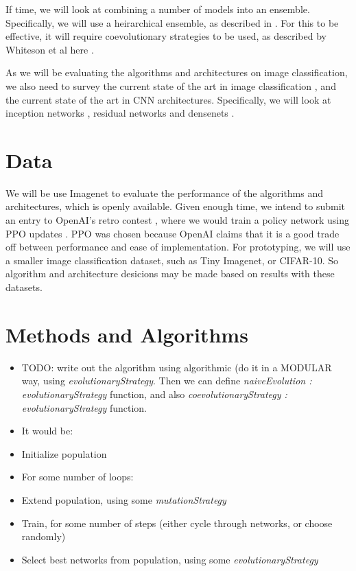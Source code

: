 \documentclass[10pt,twocolumn,letterpaper]{article}
\begin{document}
If time, we will look at combining a number of models into an ensemble. Specifically, we will use a heirarchical ensemble, as described in \cite{heirarchicalensemble}. For this to be effective, it will require coevolutionary strategies to be used, as described by Whiteson et al here \cite{shimonsarl}.

As we will be evaluating the algorithms and architectures on image classification, we also need to survey the current state of the art in image classification \cite{classify4, classify2, classify3, classify6, resnet3, as1}, and the current state of the art in CNN architectures. Specifically, we will look at inception networks \cite{inception1, inception2, inception3}, residual networks \cite{resnet1, resnet2, resnet3} and densenets \cite{densenet}.




\section{Data}
We will be use Imagenet \cite{imagenet} to evaluate the performance of the algorithms and architectures, which is openly available. Given enough time, we intend to submit an entry to OpenAI's retro contest \cite{retrocontest}, where we would train a policy network using PPO updates \cite{PPO}. PPO was chosen because OpenAI claims that it is a good trade off between performance and ease of implementation. For prototyping, we will use a smaller image classification dataset, such as Tiny Imagenet, or CIFAR-10. So algorithm and architecture desicions may be made based on results with these datasets. 


\section{Methods and Algorithms}
\begin{itemize}
	\item TODO: write out the algorithm using algorithmic (do it in a MODULAR way, using \textit{evolutionaryStrategy}. Then we can define \textit{naiveEvolution : evolutionaryStrategy} function, and also \textit{coevolutionaryStrategy : evolutionaryStrategy} function.
    \item It would be:
    \item Initialize population
    \item For some number of loops:
    \item Extend population, using some \textit{mutationStrategy}
    \item Train, for some number of steps (either cycle through networks, or choose randomly)
    \item Select best networks from population, using some \textit{evolutionaryStrategy}
\end{itemize}
\end{document}

